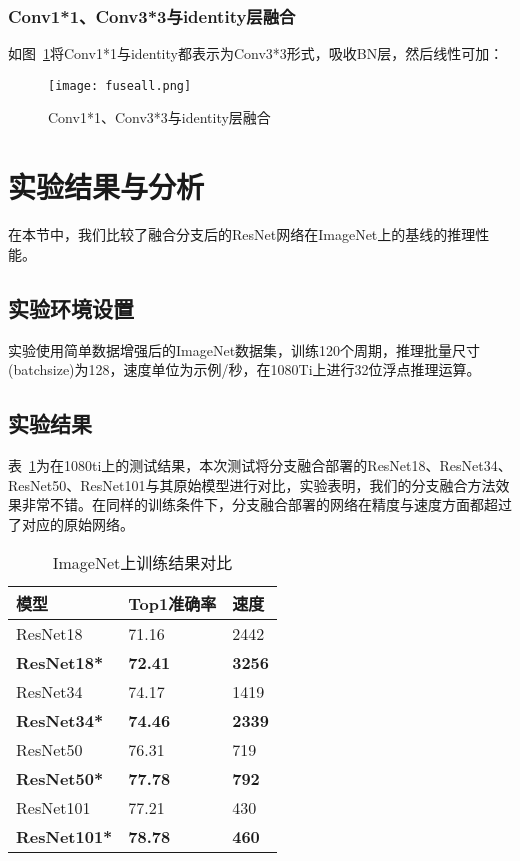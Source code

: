 \subsubsection{Conv1*1、Conv3*3与identity层融合}

如图~\ref{fig:fuseall}将Conv1*1与identity都表示为Conv3*3形式，吸收BN层，然后线性可加：

\begin{figure}[]
    \centering
    \texttt{[image: fuseall.png]}	%
    \caption{Conv1*1、Conv3*3与identity层融合}
    \label{fig:fuseall} %
\end{figure}

\section{实验结果与分析}

在本节中，我们比较了融合分支后的ResNet网络在ImageNet上的基线的推理性能。

\subsection{实验环境设置}

实验使用简单数据增强后的ImageNet数据集，训练120个周期，推理批量尺寸(batchsize)为128，速度单位为示例/秒，在1080Ti上进行32位浮点推理运算。

\subsection{实验结果}

表~\ref{tab:testresult}为在1080ti上的测试结果，本次测试将分支融合部署的ResNet18、ResNet34、ResNet50、ResNet101与其原始模型进行对比，实验表明，我们的分支融合方法效果非常不错。在同样的训练条件下，分支融合部署的网络在精度与速度方面都超过了对应的原始网络。

\begin{table}[]
    \centering
    \caption{ImageNet上训练结果对比}
    \label{tab:testresult} %
    \begin{tabular}{lll}
    \hline
    模型                  & Top1准确率        & 速度            \\ \hline
    ResNet18            & 71.16          & 2442          \\
    \textbf{ResNet18*}  & \textbf{72.41} & \textbf{3256} \\ \hline
    ResNet34            & 74.17          & 1419          \\
    \textbf{ResNet34*}  & \textbf{74.46} & \textbf{2339} \\ \hline
    ResNet50            & 76.31          & 719           \\
    \textbf{ResNet50*}  & \textbf{77.78} & \textbf{792}  \\ \hline
    ResNet101           & 77.21          & 430           \\
    \textbf{ResNet101*} & \textbf{78.78} & \textbf{460} 
    \end{tabular}
\end{table}



